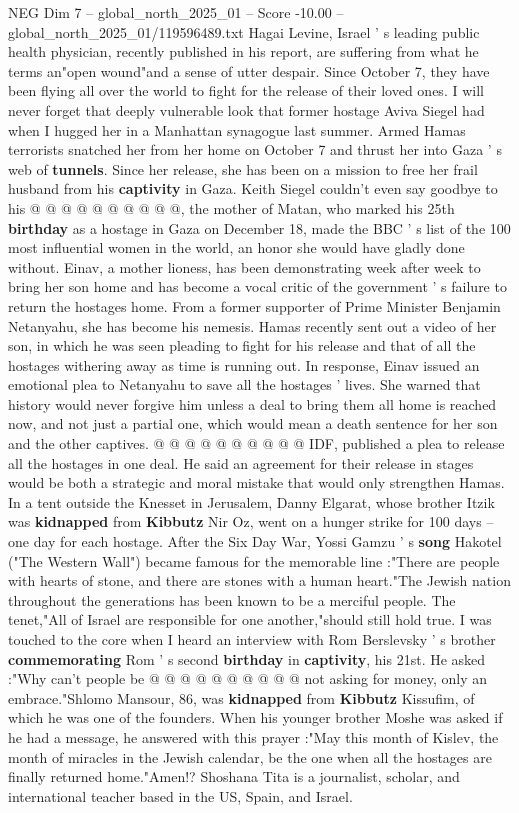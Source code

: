 \begin{textsample}{NEG Dim 7 – global\_north\_2025\_01 – Score -10.00 – global\_north\_2025\_01/119596489.txt}
Hagai Levine, Israel ' s leading public health physician, recently published in his report, are suffering from what he terms an"open wound"and a sense of utter despair.
Since October 7, they have been flying all over the world to fight for the release of their loved ones.
I will never forget that deeply vulnerable look that former hostage Aviva Siegel had when I hugged her in a Manhattan synagogue last summer.
Armed Hamas terrorists snatched her from her home on October 7 and thrust her into Gaza ' s web of \textbf{tunnels}.
Since her release, she has been on a mission to free her frail husband from his \textbf{captivity} in Gaza.
Keith Siegel couldn't even say goodbye to his @ @ @ @ @ @ @ @ @ @, the mother of Matan, who marked his 25th \textbf{birthday} as a hostage in Gaza on December 18, made the BBC ' s list of the 100 most influential women in the world, an honor she would have gladly done without.
Einav, a mother lioness, has been demonstrating week after week to bring her son home and has become a vocal critic of the government ' s failure to return the hostages home.
From a former supporter of Prime Minister Benjamin Netanyahu, she has become his nemesis.
Hamas recently sent out a video of her son, in which he was seen pleading to fight for his release and that of all the hostages withering away as time is running out.
In response, Einav issued an emotional plea to Netanyahu to save all the hostages ' lives.
She warned that history would never forgive him unless a deal to bring them all home is reached now, and not just a partial one, which would mean a death sentence for her son and the other captives. @ @ @ @ @ @ @ @ @ @ IDF, published a plea to release all the hostages in one deal.
He said an agreement for their release in stages would be both a strategic and moral mistake that would only strengthen Hamas.
In a tent outside the Knesset in Jerusalem, Danny Elgarat, whose brother Itzik was \textbf{kidnapped} from \textbf{Kibbutz} Nir Oz, went on a hunger strike for 100 days -- one day for each hostage.
After the Six Day War, Yossi Gamzu ' s \textbf{song} Hakotel ("The Western Wall") became famous for the memorable line :"There are people with hearts of stone, and there are stones with a human heart."The Jewish nation throughout the generations has been known to be a merciful people.
The tenet,"All of Israel are responsible for one another,"should still hold true.
I was touched to the core when I heard an interview with Rom Berslevsky ' s brother \textbf{commemorating} Rom ' s second \textbf{birthday} in \textbf{captivity}, his 21st.
He asked :"Why can't people be @ @ @ @ @ @ @ @ @ @ not asking for money, only an embrace."Shlomo Mansour, 86, was \textbf{kidnapped} from \textbf{Kibbutz} Kissufim, of which he was one of the founders.
When his younger brother Moshe was asked if he had a message, he answered with this prayer :"May this month of Kislev, the month of miracles in the Jewish calendar, be the one when all the hostages are finally returned home."Amen!?
Shoshana Tita is a journalist, scholar, and international teacher based in the US, Spain, and Israel.

\end{textsample}
